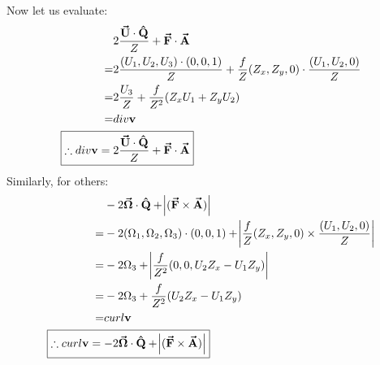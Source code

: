 \documentclass{article}
\newcommand{\boldvec}[1]{\boldsymbol{\vec{\textbf{#1}}}}
\newcommand{\capvec}[1]{\boldsymbol{\hat{\textbf{#1}}}}
\begin{document}
Now let us evaluate:
\begin{align*}
    & 2\frac{\boldvec{U}\cdot\capvec{Q}}{Z} + \boldvec{F}\cdot\boldvec{A}\\
    =& 2\frac{(U_1,U_2,U_3)\cdot(0,0,1)}{Z} + \frac{f}{Z}(Z_x,Z_y,0)\cdot \frac{(U_1,U_2,0)}{Z} \\
    =& 2\frac{U_3}{Z} + \frac{f}{Z^2}(Z_xU_1 + Z_yU_2)\\
    =& div\mathbf{v}\\
    \Aboxed{\therefore div\mathbf{v} =& 2\frac{\boldvec{U}\cdot\capvec{Q}}{Z} + \boldvec{F}\cdot\boldvec{A}}\\
\end{align*}
Similarly, for others:
\begin{align*}
    &-2\boldvec{$\Omega$} \cdot \capvec{Q} + \abs{ (\boldvec{F} \times \boldvec{A}) }\\
    =& -2(\Omega_1,\Omega_2,\Omega_3)\cdot(0,0,1) + \abs{\frac{f}{Z}(Z_x,Z_y,0)\times \frac{(U_1,U_2,0)}{Z}}\\
    =& -2\Omega_3 + \abs{\frac{f}{Z^2}(0,0,U_2Z_x - U_1Z_y)}\\
    =& -2\Omega_3 + \frac{f}{Z^2}(U_2Z_x - U_1Z_y)\\
    =& curl\mathbf{v}\\
    \Aboxed{\therefore curl\mathbf{v} =& -2\boldvec{$\Omega$} \cdot \capvec{Q} + \abs{ (\boldvec{F} \times \boldvec{A}) }}
\end{align*}
\end{document}
